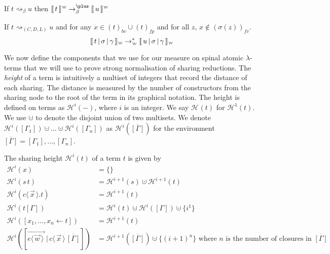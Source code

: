 \documentclass[a4paper,UKenglish,cleveref, autoref]{lipics-v2019}
\newcommand{\fv}[1]{(#1)_{fv}}
\newcommand{\bv}[1]{(#1)_{bv}}
\newcommand{\fp}[1]{(#1)_{fp}}
\newcommand{\set}[1]{ \{ #1 \} }
\newcommand{\app}[2]{#1 \, #2}
\newcommand{\fake}[3]{#1 \langle \, #2 \, \rangle . #3}
\newcommand{\share}[3]{#1 [#2 \leftarrow #3]}
\newcommand{\dist}[5]{#1 [ #2 \, \vert \, \fakedist{#4}{#5} \, #3 ]}
\newcommand{\fakedist}[2]{#1 \langle \, #2 \, \rangle}
\newcommand{\vecdist}[2]{\overrightarrow{\fakedist{#1}{#2} \,}}
\newcommand{\weaksymbol}{\mbox{\tiny $\mathcal{W}$}}
\newcommand{\readweakwmap}[3]{\llbracket \, #1 \, \vert \, #2 \, \vert \, #3  \, \rrbracket_{\weaksymbol} }
\newcommand{\composeweak}[1]{\llbracket \, #1 \, \rrbracket^{\weaksymbol}}
\newcommand{\height}[2]{\mathcal{H}^{#1}(#2)}
\begin{document}
\begin{lemma}
\label{lem:sharepreservebeta}
	If $t \rightsquigarrow_{\beta} u$ then $\composeweak{t} \rightarrow^{\plus}_{\beta} \composeweak{u}$
\end{lemma}

\begin{lemma}
\label{theo:sharepreserve}
	If $t \rightsquigarrow_{(C, D, L)} u$ and for any $x \in \bv{t} \cup \fp{t}$ and for all $z$, $x \not\in \fv{\sigma(z)}$.  $$\readweakwmap{t}{\sigma}{\gamma} \rightarrow^{*}_{\weaksymbol} \readweakwmap{u}{\sigma}{\gamma}$$

\end{lemma}

We now define the components that we use for our measure on spinal atomic $\lambda$-terms that we will use to prove strong normalisation of sharing reductions. The \emph{height} of a term is intuitively a multiset of integers that record the distance of each sharing. The distance is measured by the number of constructors from the sharing node to the root of the term in its graphical notation. The height is defined on terms as $\height{i}{-}$, where $i$ is an integer. We say $\height{}{t}$ for $\height{1}{t}$. We use $\cupdot$ to denote the disjoint union of two multisets. We denote $\height{i}{[\Gamma_{1}]} \cupdot \dots \cupdot \height{i}{[\Gamma_{n}]}$ as $\height{i}{\overline{[\Gamma]}}$ for the environment $\overline{[\Gamma]} = [\Gamma_{1}], \dots, [\Gamma_{n}]$.

\begin{definition}
The sharing height $\height{i}{t}$ of a term $t$ is given by
\begingroup
\allowdisplaybreaks
\begin{align*}
	\height{i}{x} &= \set{} \\
	\height{i}{ \app{s}{t} } &= \height{i+1}{s} \cupdot \height{i+1}{t} \\
	\height{i}{\fake{c}{\vec{x}}{t}} &= \height{i + 1}{t} \\
	\height{i}{t[\Gamma]} &= \height{i}{t} \cupdot \height{i}{[\Gamma]} \cupdot \set{i^{1}} \\
	\height{i}{\share{}{x_{1}, \dots, x_{n}}{t}} &= \height{i+1}{t}\\
	\height{i}{\dist{}{\vecdist{e}{\vec{w}}}{\overline{[\Gamma]}}{c}{\vec{x}}} &= \height{i + 1}{\overline{[\Gamma]}} \cupdot \set{(i + 1)^{n}} \text{ where $n$ is the number of closures in $\overline{[\Gamma]}$}
\end{align*}
\endgroup
\end{definition}
\end{document}
